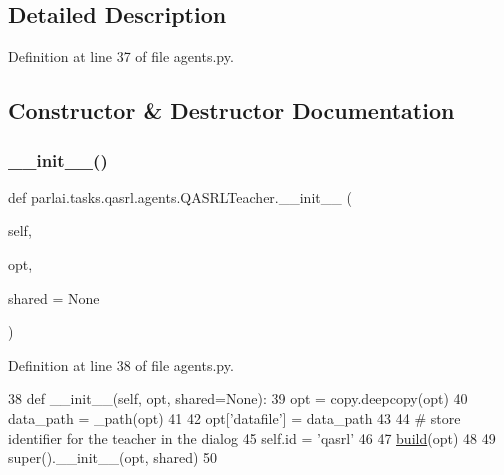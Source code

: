 \subsection{Detailed Description}


Definition at line 37 of file agents.\+py.



\subsection{Constructor \& Destructor Documentation}
\mbox{\label{classparlai_1_1tasks_1_1qasrl_1_1agents_1_1QASRLTeacher_a53eb0fa6773eb55e1a9088f78930c9c6}} 
\subsubsection{\texorpdfstring{\+\_\+\+\_\+init\+\_\+\+\_\+()}{\_\_init\_\_()}}
{\footnotesize\ttfamily def parlai.\+tasks.\+qasrl.\+agents.\+Q\+A\+S\+R\+L\+Teacher.\+\_\+\+\_\+init\+\_\+\+\_\+ (\begin{DoxyParamCaption}\item[{}]{self,  }\item[{}]{opt,  }\item[{}]{shared = {\ttfamily None} }\end{DoxyParamCaption})}



Definition at line 38 of file agents.\+py.


\begin{DoxyCode}
38     \textcolor{keyword}{def }\_\_init\_\_(self, opt, shared=None):
39         opt = copy.deepcopy(opt)
40         data\_path = \_path(opt)
41 
42         opt[\textcolor{stringliteral}{'datafile'}] = data\_path
43 
44         \textcolor{comment}{# store identifier for the teacher in the dialog}
45         self.id = \textcolor{stringliteral}{'qasrl'}
46 
47         \hyperlink{namespaceparlai_1_1mturk_1_1tasks_1_1talkthewalk_1_1download_a8c0fbb9b6dfe127cb8c1bd6e7c4e33fd}{build}(opt)
48 
49         super().\_\_init\_\_(opt, shared)
50 
\end{DoxyCode}



